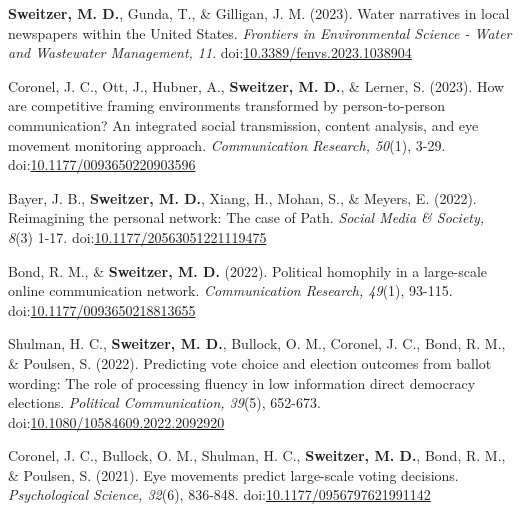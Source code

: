 \documentclass[letterpaper, 10pt]{extarticle}
\renewenvironment{itemize}{
  \begin{list}{}{
    \setlength{\leftmargin}{10pt}
  }
}{
  \end{list}
}
\begin{document}
\begin{itemize}
\setlength\itemindent{-0.5em}
\item \textbf{Sweitzer, M. D.}, Gunda, T., \& Gilligan, J. M. (2023). Water narratives in local newspapers within the United States. \textit{Frontiers in Environmental Science - Water and Wastewater Management, 11}. doi:\href{https://github.com/Matt-Sweitzer/Papers/blob/master/Sweitzer2023.pdf}{10.3389/fenvs.2023.1038904}

\item Coronel, J. C., Ott, J., Hubner, A., \textbf{Sweitzer, M. D.}, \& Lerner, S. (2023). How are competitive framing environments transformed by person-to-person communication? An integrated social transmission, content analysis, and eye movement monitoring approach. \textit{Communication Research, 50}(1), 3-29. doi:\href{https://github.com/Matt-Sweitzer/Papers/blob/master/Coroneletal2020a.pdf}{10.1177/0093650220903596}

\item Bayer, J. B., \textbf{Sweitzer, M. D.}, Xiang, H., Mohan, S., \& Meyers, E. (2022). Reimagining the personal network: The case of Path. \textit{Social Media \& Society, 8}(3) 1-17. doi:\href{https://github.com/Matt-Sweitzer/Papers/blob/master/Bayeretal2022.pdf}{10.1177/20563051221119475}

\item Bond, R. M., \& \textbf{Sweitzer, M. D.} (2022). Political homophily in a large-scale online communication network. \textit{Communication Research, 49}(1), 93-115. doi:\href{https://github.com/Matt-Sweitzer/Papers/blob/master/BondSweitzer2018.pdf}{10.1177/0093650218813655}

\item Shulman, H. C., \textbf{Sweitzer, M. D.}, Bullock, O. M., Coronel, J. C., Bond, R. M., \& Poulsen, S. (2022). Predicting vote choice and election outcomes from ballot wording: The role of processing fluency in low information direct democracy elections. \textit{Political Communication, 39}(5), 652-673. doi:\href{https://github.com/Matt-Sweitzer/Papers/blob/master/Shulmanetal2022.pdf}{10.1080/10584609.2022.2092920}

\item Coronel, J. C., Bullock, O. M., Shulman, H. C., \textbf{Sweitzer, M. D.}, Bond, R. M., \& Poulsen, S. (2021). Eye movements predict large-scale voting decisions. \textit{Psychological Science, 32}(6), 836-848. doi:\href{https://github.com/Matt-Sweitzer/Papers/blob/master/Coroneletal2021.pdf}{10.1177/0956797621991142}


\end{itemize}
\end{document}
